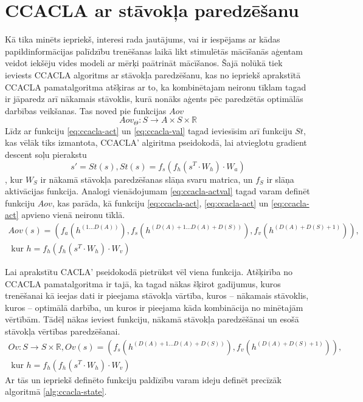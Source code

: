 \documentclass{ludis} %
\begin{document}
\section{CCACLA ar stāvokļa paredzēšanu}
Kā tika minēts iepriekš, interesi rada jautājums, vai ir iespējams ar kādas
papildinformācijas palīdzību trenēšanas laikā likt stimulētās mācīšanās aģentam
veidot iekšēju vides modeli ar mērķi paātrināt mācīšanos. Šajā nolūkā tiek
ieviests CCACLA algoritms ar stāvokļa paredzēšanu, kas no iepriekš aprakstītā
CCACLA pamatalgoritma atšķiras ar to, ka kombinētajam neironu tīklam tagad ir
jāparedz arī nākamais stāvoklis, kurā nonāks aģents pēc paredzētās optimālās
darbības veikšanas. Tas noved pie funkcijas $Aov$ 
\begin{equation}
  Aov_\Theta:S \rightarrow A \times S \times \mathbb{R}
\end{equation}
Līdz ar funkciju \ref{eq:ccacla-act} un \ref{eq:ccacla-val} tagad ieviesīsim arī
funkciju $St$, kas vēlāk tiks izmantota, CCACLA' algiritma pseidokodā, lai
atvieglotu gradient descent soļu pierakstu
\begin{equation}\label{eq:ccacla-obs}
  s' = St(s), St(s) = f_s(f_h(s^T \cdot W_h) \cdot W_a)
\end{equation} 
, kur $W_S$ ir nākamā stāvokļa paredzēšanas slāņa svaru matrica, un $f_S$ ir
slāņa aktivācijas funkcija.
Analogi vienādojumam \ref{eq:ccacla-actval} tagad varam definēt funkciju $Aov$,
kas parāda, kā funkciju \ref{eq:ccacla-act}, \ref{eq:ccacla-act} un
\ref{eq:ccacla-act} apvieno vienā neironu tīklā.
\begin{multline}\label{eq:ccacla-actobsval}
  Aov(s) = \left(f_a(h^{(1 \ldots D(A))}),
                 f_s(h^{(D(A) + 1 \ldots D(A) + D(S))}),
                 f_v(h^{(D(A) + D(S) + 1)})\right), \\
  \text{ kur } h = f_h\left(f_h(s^T \cdot W_h) \cdot W_v\right)
\end{multline}

Lai aprakstītu CACLA' pseidokodā pietrūkst vēl viena funkcija. Atšķirība no
CCACLA pamatalgoritma ir tajā, ka tagad nākas šķirot gadījumus, kuros
trenēšanai kā ieejas dati ir pieejama stāvokļa vārtība, kuros -- nākamais
stāvoklis, kuros -- optimālā darbība, un kuros ir pieejama kāda kombinācija no
minētajām vērtībām. Tādēļ nākas ieviest funkciju, nākamā stāvokļa paredzēšānai
un esošā stāvokļa vērtības paredzēšanai.
\begin{multline}\label{eq:ccacla-obsval}
  Ov: S \rightarrow S \times \mathbb{R},
        Ov(s) = \left(f_s(h^{(D(A) + 1 \ldots D(A) + D(S))}),
                 f_v(h^{(D(A) + D(S) + 1)})\right), \\
  \text{ kur } h = f_h\left(f_h(s^T \cdot W_h) \cdot W_v\right)
\end{multline}
Ar tās un iepriekš definēto funkciju paldīzību varam ideju definēt precīzāk
algoritmā \ref{alg:ccacla-state}.
\end{document}
